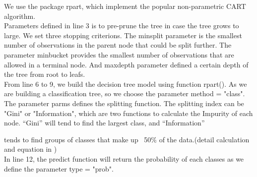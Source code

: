      \noindent We use the package rpart, which implement the popular non-parametric CART algorithm. \\
     [\baselineskip]\noindent Parameters defined in line 3 is to pre-prune the tree in case the tree grows to large. We set three stopping criterions. The minsplit parameter is the smallest number of observations in the parent node that could be split further. The parameter minbucket provides the smallest number of observations that are allowed in a terminal node. And maxdepth parameter defined a certain depth of the tree from root to leafs. \\
     [\baselineskip]\noindent From line 6 to 9, we build the decision tree model using function rpart(). As we are building a classification tree, so we choose the parameter method = "class". The parameter parms defines the splitting function. The splitting index can be "Gini" or "Information", which are two functions to calculate the Impurity of each node. “Gini” will tend to find the largest class, and “Information” \begin{flushleft}
     
     \end{flushleft}tends to find groups of classes that make up ~50\% of the data.(detail calculation and equation in \citep{terry})\\
     [\baselineskip]\noindent In line 12, the predict function will return the probability of each classes as we define the parameter type = "prob".
     
